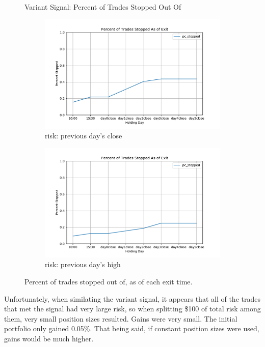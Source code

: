 \documentclass{article}
\begin{document}
\begin{figure}
\centering
Variant Signal: Percent of Trades Stopped Out Of
\begin{subfigure}{\linewidth}
  \centering
  \includegraphics[width=\linewidth]{pc_stop_risk_close_var_1.pdf}
  \caption{risk: previous day's close}
\end{subfigure}
\begin{subfigure}{\linewidth}
  \centering
  \includegraphics[width=\linewidth]{pc_stop_risk_high_var_1.pdf}
  \caption{risk: previous day's high}
\end{subfigure}
\caption{Percent of trades stopped out of, as of each exit time.}
\end{figure}

Unfortunately, when similating the variant signal, it appears that all of the trades that met the signal had very large risk, so when splitting \$100 of total risk among them, very small position sizes resulted. Gains were very small. The initial portfolio only gained 0.05\%. That being said, if constant position sizes were used, gains would be much higher. 
\end{document}
